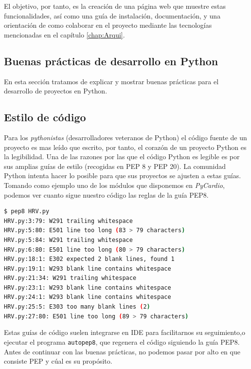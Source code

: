 El objetivo, por tanto, es la creación de una página web que muestre estas funcionalidades, así como una guía de instalación, documentación, y una orientación de como colaborar en el proyecto mediante las tecnologías mencionadas en el capítulo \ref{chap:Arqui}.

\subsection{Buenas prácticas de desarrollo en Python}
\label{subsec:bestPracticses}
En esta sección tratamos de explicar y mostrar buenas prácticas para el desarrollo de proyectos en Python.\\

\subsection*{Estilo de código}
\label{subsec:stylePython}
Para los \emph{pythonistas} (desarrolladores veteranos de Python) el código fuente de un proyecto es mas leído que escrito, por tanto, el corazón de un proyecto Python es la legibilidad. Una de las razones por las que el código Python es legible es por sus amplias guías de estilo (recogidas en PEP 8 y PEP 20). La comunidad Python intenta hacer lo posible para que sus proyectos se ajusten a estas guías. Tomando como ejemplo uno de los módulos que disponemos en \emph{PyCardio}, podemos ver cuanto sigue nuestro código las reglas de la guía PEP8. \\ 
\begin{lstlisting}[language=sh, caption=Ejemplo de PEP8 con \emph{PyCardio},label=pep8]
$ pep8 HRV.py
HRV.py:3:79: W291 trailing whitespace
HRV.py:5:80: E501 line too long (83 > 79 characters)
HRV.py:5:84: W291 trailing whitespace
HRV.py:6:80: E501 line too long (80 > 79 characters)
HRV.py:18:1: E302 expected 2 blank lines, found 1
HRV.py:19:1: W293 blank line contains whitespace
HRV.py:21:34: W291 trailing whitespace
HRV.py:23:1: W293 blank line contains whitespace
HRV.py:24:1: W293 blank line contains whitespace
HRV.py:25:5: E303 too many blank lines (2)
HRV.py:27:80: E501 line too long (89 > 79 characters)
\end{lstlisting}
Estas guías de código suelen integrarse en IDE para facilitarnos su seguimiento,o ejecutar el programa \texttt{autopep8}, que regenera el código siguiendo la guía PEP8. Antes de continuar con las buenas prácticas, no podemos pasar por alto en que consiste PEP y cúal es su propósito. \\
